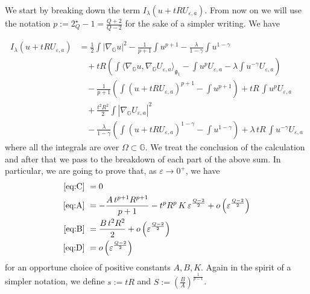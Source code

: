 \documentclass[11pt]{amsart}
\numberwithin{equation}{section} %
\theoremstyle{definition}
\def\G{\mathbb{G}}
\begin{document}
We start by breaking down the term $I_\lambda(u+tRU_{\varepsilon,a})$. From now on
we will use the notation $p:=2^\star_Q-1=\frac{Q+2}{Q-2}$
for the sake of a simpler writing. We have

\begin{align*}
    I_\lambda(u+tRU_{\varepsilon,a})&=
    \frac{1}{2}\int|\nabla_{\G}u|^2-\frac{1}{p+1}\int u^{p+1}-\frac{\lambda}{1-\gamma}\int u^{1-\gamma}\\
    &\ \ \ \ +tR \left(\int\langle \nabla_{\G}u,\nabla_{\G}U_{\varepsilon,a}\rangle_{\mathfrak{g}_{1}}-\int u^pU_{\varepsilon,a}-\lambda\int u^{-\gamma}U_{\varepsilon,a}\right)\tag{C}\label{eq:C}\\
    &\ \ \ \ -\frac{1}{p+1}\left(\int(u+tRU_{\varepsilon,a})^{p+1}-\int u^{p+1}\right)+tR\, \int u^pU_{\varepsilon,a}\tag{A}\label{eq:A}\\
    &\ \ \ \ +\frac{t^2R^2}{2} \int|\nabla_{\G}U_{\varepsilon,a}|^2\tag{B}\label{eq:B}\\
    &\ \ \ \ -\frac{\lambda}{1-\gamma}\left(\int(u+tRU_{\varepsilon,a})^{1-\gamma}-\int u^{1-\gamma}\right)+\lambda\, tR\, \int u^{-\gamma}U_{\varepsilon,a}\tag{D}\label{eq:D}
\end{align*}
where all the integrals are over $\Omega\subset \G$.
We treat the conclusion of the calculation and after that we pass to the breakdown of each part of the above sum.
In particular, we are going to prove that, as $\varepsilon \to 0^+$, we have
\begin{align*}
    \eqref{eq:C}&\ =0\\
\eqref{eq:A}&\ =-\frac{A\, t^{p+1}R^{p+1}}{p+1}-t^pR^p\, K\, \varepsilon^{\frac{Q-2}{2}}+o\left(\varepsilon^{\frac{Q-2}{2}}\right)\\
    \eqref{eq:B}&\ =\frac{B\, t^2R^2}{2}+o\left(\varepsilon^{\frac{Q-2}{2}}\right)\\
    \eqref{eq:D}&\ =o\left(\varepsilon^{\frac{Q-2}{2}}\right)
\end{align*}
for an opportune choice of positive constants $A,B,K$.
Again in the spirit of a simpler notation,
we define $s:=tR$ and $S:=\left(\frac{B}{A}\right)^{\frac{1}{p-1}}$.\newline
\end{document}

